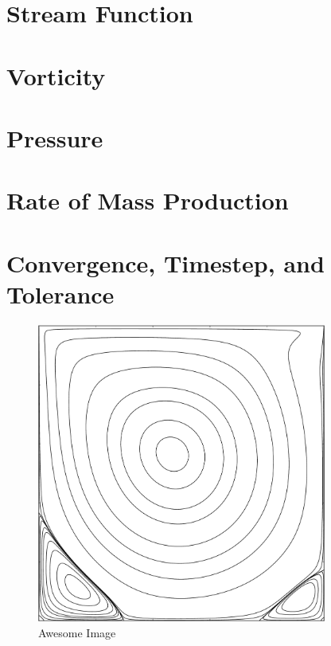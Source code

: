 \section{Stream Function}

\section{Vorticity}

\section{Pressure}

\section{Rate of Mass Production}

\section{Convergence, Timestep, and Tolerance}

\begin{figure}[p]
    \centering
    \includegraphics[width=0.85\textwidth]{Images/streamFunction.pdf}
    \caption{Awesome Image}
    \label{fig:awesome_image}
\end{figure}

